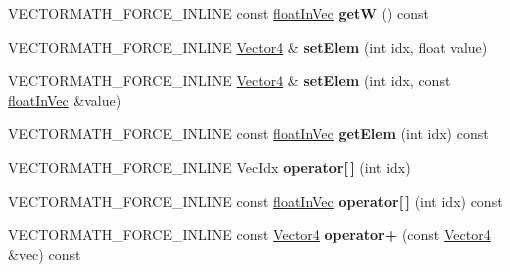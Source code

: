 \begin{DoxyCompactItemize}
V\+E\+C\+T\+O\+R\+M\+A\+T\+H\+\_\+\+F\+O\+R\+C\+E\+\_\+\+I\+N\+L\+I\+NE const \hyperlink{classVectormath_1_1floatInVec}{float\+In\+Vec} {\bfseries getW} () const
\item 
\mbox{\label{classVectormath_1_1Aos_1_1Vector4_adb13ca4795d04c6badc13e625265ca1b}} 
V\+E\+C\+T\+O\+R\+M\+A\+T\+H\+\_\+\+F\+O\+R\+C\+E\+\_\+\+I\+N\+L\+I\+NE \hyperlink{classVectormath_1_1Aos_1_1Vector4}{Vector4} \& {\bfseries set\+Elem} (int idx, float value)
\item 
\mbox{\label{classVectormath_1_1Aos_1_1Vector4_a21282ca6c2aa5889f41df1f9c83f6dc8}} 
V\+E\+C\+T\+O\+R\+M\+A\+T\+H\+\_\+\+F\+O\+R\+C\+E\+\_\+\+I\+N\+L\+I\+NE \hyperlink{classVectormath_1_1Aos_1_1Vector4}{Vector4} \& {\bfseries set\+Elem} (int idx, const \hyperlink{classVectormath_1_1floatInVec}{float\+In\+Vec} \&value)
\item 
\mbox{\label{classVectormath_1_1Aos_1_1Vector4_a2b57b84ded5d12fb7531973bb1a88abc}} 
V\+E\+C\+T\+O\+R\+M\+A\+T\+H\+\_\+\+F\+O\+R\+C\+E\+\_\+\+I\+N\+L\+I\+NE const \hyperlink{classVectormath_1_1floatInVec}{float\+In\+Vec} {\bfseries get\+Elem} (int idx) const
\item 
\mbox{\label{classVectormath_1_1Aos_1_1Vector4_af17b2f536750a2cbbef96c855ef43eda}} 
V\+E\+C\+T\+O\+R\+M\+A\+T\+H\+\_\+\+F\+O\+R\+C\+E\+\_\+\+I\+N\+L\+I\+NE Vec\+Idx {\bfseries operator\mbox{[}$\,$\mbox{]}} (int idx)
\item 
\mbox{\label{classVectormath_1_1Aos_1_1Vector4_a19518806cfe69127b9abcf71c02610b0}} 
V\+E\+C\+T\+O\+R\+M\+A\+T\+H\+\_\+\+F\+O\+R\+C\+E\+\_\+\+I\+N\+L\+I\+NE const \hyperlink{classVectormath_1_1floatInVec}{float\+In\+Vec} {\bfseries operator\mbox{[}$\,$\mbox{]}} (int idx) const
\item 
\mbox{\label{classVectormath_1_1Aos_1_1Vector4_ad9a9cb586efff8d00403a97562e7cda9}} 
V\+E\+C\+T\+O\+R\+M\+A\+T\+H\+\_\+\+F\+O\+R\+C\+E\+\_\+\+I\+N\+L\+I\+NE const \hyperlink{classVectormath_1_1Aos_1_1Vector4}{Vector4} {\bfseries operator+} (const \hyperlink{classVectormath_1_1Aos_1_1Vector4}{Vector4} \&vec) const
\item 

\end{DoxyCompactItemize}
